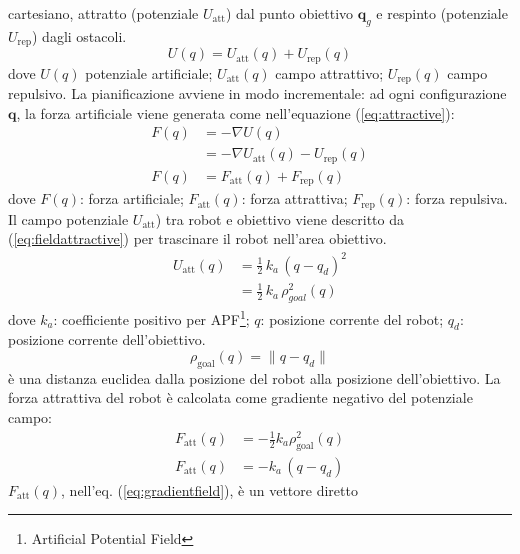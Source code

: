 cartesiano, attratto (potenziale $U_{\text{att}}$) dal punto obiettivo
$\mathbf{q}_g$ e respinto (potenziale $U_{\text{rep}}$) dagli ostacoli.
\begin{equation}
\label{eq:apfm}
U(q) = U_{\text{att}}(q) + U_{\text{rep}}(q)
\end{equation}
%
\noindent dove $U(q)$ potenziale artificiale; $U_{\text{att}}(q)$ campo
attrattivo; $U_{\text{rep}}(q)$ campo repulsivo.
La pianificazione avviene in modo incrementale: ad ogni configurazione
$\mathbf{q}$, la forza artificiale viene generata come nell'equazione (\ref{eq:attractive}):
\begin{equation}
\label{eq:attractive}
\begin{split}
F(q) &= - \nabla U(q)\\
&= - \nabla U_{\text{att}}(q) -U_{\text{rep}}(q)\\
F(q) &= F_{\text{att}}(q) + F_{\text{rep}}(q)
\end{split}
\end{equation}
dove $F(q)$: forza artificiale; $F_{\text{att}}(q)$: forza attrattiva;
$F_{\text{rep}}(q)$: forza repulsiva. Il campo potenziale $U_{\text{att}}$) tra
robot e obiettivo viene descritto da (\ref{eq:fieldattractive}) per trascinare
il robot nell'area obiettivo.
\begin{equation}
\label{eq:fieldattractive}
\begin{split}
U_{\text{att}}(q) &= \frac{1}{2} \, k_a \, (q-q_d)^2\\
&= \frac{1}{2} \, k_a \, \rho^{2}_{goal}(q)
\end{split}
\end{equation}
dove $k_a$: coefficiente positivo per APF\footnote{Artificial Potential Field};
$q$: posizione corrente del robot; $q_{d}$: posizione corrente dell'obiettivo.
\begin{equation}
  \rho_{\text{goal}}(q) = \|q-q_{d}\|
\end{equation}
è una distanza euclidea dalla posizione del robot alla posizione dell'obiettivo.
La forza attrattiva del robot è calcolata come gradiente negativo del potenziale
campo\cite{6283526}:
\begin{equation}
\label{eq:gradientfield}
\begin{split}
F_{\text{att}}(q) &= -\frac{1}{2}k_a \rho^2_{\text{goal}}(q)\\
F_{\text{att}}(q) &= -k_a \, (q-q_d)
\end{split}
\end{equation}
%
$F_{\text{att}}(q)$, nell'eq. (\ref{eq:gradientfield}), è un vettore diretto
